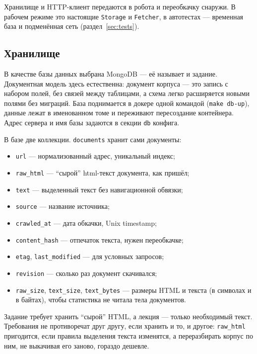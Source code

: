 Хранилище и HTTP-клиент передаются в робота и переобкачку снаружи. В рабочем
режиме это настоящие \texttt{Storage} и \texttt{Fetcher}, в автотестах ---
временная база и подменённая сеть (раздел~\ref{sec:tests}).

\subsection*{Хранилище}

В качестве базы данных выбрана MongoDB --- её называет и задание. Документная
модель здесь естественна: документ корпуса --- это запись с набором полей, без
связей между таблицами, а схема легко расширяется новыми полями без миграций.
База поднимается в докере одной командой (\texttt{make db-up}), данные лежат в
именованном томе и переживают пересоздание контейнера. Адрес сервера и имя базы
задаются в секции \texttt{db} конфига.

В базе две коллекции. \texttt{documents} хранит сами документы:

\begin{itemize}
    \item \texttt{url} --- нормализованный адрес, уникальный индекс;
    \item \texttt{raw\_html} --- \enquote{сырой} html-текст документа, как пришёл;
    \item \texttt{text} --- выделенный текст без навигационной обвязки;
    \item \texttt{source} --- название источника;
    \item \texttt{crawled\_at} --- дата обкачки, Unix timestamp;
    \item \texttt{content\_hash} --- отпечаток текста, нужен переобкачке;
    \item \texttt{etag}, \texttt{last\_modified} --- для условных запросов;
    \item \texttt{revision} --- сколько раз документ скачивался;
    \item \texttt{raw\_size}, \texttt{text\_size}, \texttt{text\_bytes} ---
          размеры HTML и текста (в символах и в байтах), чтобы статистика не
          читала тела документов.
\end{itemize}

Задание требует хранить \enquote{сырой} HTML, а лекция --- только необходимый
текст. Требования не противоречат друг другу, если хранить и то, и другое:
\texttt{raw\_html} пригодится, если правила выделения текста изменятся, а
переразбирать корпус по ним, не выкачивая его заново, гораздо дешевле.

